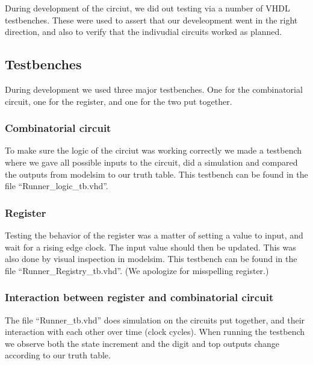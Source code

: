 During development of the circiut, we did out testing via a number of VHDL testbenches. These were used to assert that our 
develeopment went in the right direction, and also to verify that the indivudial circuits worked as planned.

\subsection{Testbenches}
During development we used three major testbenches. One for the combinatorial circuit, one for the register, and one for the 
two put together. 

\subsubsection{Combinatorial circuit}
To make sure the logic of the circiut was working correctly we made a testbench where we gave all possible inputs to the circuit,
did a simulation and compared the outputs from modelsim to our truth table. This testbench can be found in the file ``Runner\_logic\_tb.vhd''.

\subsubsection{Register}
Testing the behavior of the register was a matter of setting a value to input, and wait for a rising edge clock. The input value 
should then be updated. This was also done by visual inspection in modelsim. This testbench can be found in the file ``Runner\_Registry\_tb.vhd''. 
(We apologize for misspelling register.)

\subsubsection{Interaction between register and combinatorial circuit}
The file ``Runner\_tb.vhd'' does simulation on the circuits put together, and their interaction with each other over time (clock cycles). 
When running the testbench we observe both the state increment and the digit and top outputs change according to our truth table.